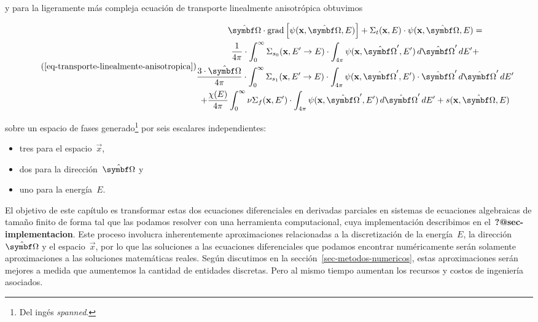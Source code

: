 \documentclass[
  12pt,
  a4paper,
  table]{scrbook}
\providecommand{\tightlist}{%
  \setlength{\itemsep}{0pt}\setlength{\parskip}{0pt}}\usepackage{longtable,booktabs,array}
\theoremstyle{plain}
\theoremstyle{definition}
\theoremstyle{plain}
\theoremstyle{plain}
\theoremstyle{remark}
\begin{document}
y para la ligeramente más compleja ecuación de transporte linealmente
anisotrópica obtuvimos

\[ \tag{\ref{eq-transporte-linealmente-anisotropica}}
\begin{gathered}
 \omegaversor \cdot \text{grad} \left[ \psi(\vec{x}, \omegaversor, E) \right]
 + \Sigma_t(\vec{x}, E) \cdot \psi(\vec{x}, \omegaversor, E) = \\
\frac{1}{4\pi} \cdot 
\int_{0}^{\infty} \Sigma_{s_0}(\vec{x}, E^{\prime} \rightarrow E) \cdot \int_{4\pi} \psi(\vec{x}, \omegaprimaversor, E^{\prime}) \, d\omegaprimaversor \, dE^\prime + \\
\frac{3 \cdot \omegaversor}{4\pi} \cdot
\int_{0}^{\infty} \Sigma_{s_1}(\vec{x}, E^{\prime} \rightarrow E) \cdot \int_{4\pi} \psi(\vec{x}, \omegaprimaversor, E^{\prime}) \cdot \omegaprimaversor \, d\omegaprimaversor \, dE^\prime  \\
+ \frac{\chi(E)}{4\pi} \int_{0}^{\infty} \nu\Sigma_f(\vec{x}, E^\prime) \cdot \int_{4\pi} \psi(\vec{x}, \omegaprimaversor, E^{\prime}) \, d\omegaprimaversor \, dE^\prime 
+ s(\vec{x}, \omegaversor, E)
\end{gathered}
\]

sobre un espacio de fases generado\footnote{Del ingés
  \foreignlanguage{american}{\emph{spanned}}.} por seis escalares
independientes:

\begin{itemize}
\tightlist
\item
  tres para el espacio~\(\vec{x}\),
\item
  dos para la dirección~\(\omegaversor\) y
\item
  uno para la energía~\(E\).
\end{itemize}

El objetivo de este capítulo es transformar estas dos ecuaciones
diferenciales en derivadas parciales en sistemas de ecuaciones
algebraicas de tamaño finito de forma tal que las podamos resolver con
una herramienta computacional, cuya implementación describimos en
el~\textbf{?@sec-implementacion}. Este proceso involucra inherentemente
aproximaciones relacionadas a la discretización de la energía~\(E\), la
dirección~\(\omegaversor\) y el espacio~\(\vec{x}\), por lo que las
soluciones a las ecuaciones diferenciales que podamos encontrar
numéricamente serán solamente aproximaciones a las soluciones
matemáticas reales. Según discutimos en la
sección~\ref{sec-metodos-numericos}, estas aproximaciones serán mejores
a medida que aumentemos la cantidad de entidades discretas. Pero al
mismo tiempo aumentan los recursos y costos de ingeniería asociados.
\end{document}
